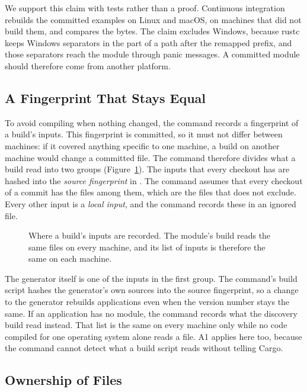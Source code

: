 \documentclass[sigconf,nonacm]{acmart}
\begin{document}
We support this claim with tests rather than a proof. Continuous integration rebuilds the committed examples on Linux and macOS, on machines that did not build them, and compares the bytes. The claim excludes Windows, because rustc keeps Windows separators in the part of a path after the remapped prefix, and those separators reach the module through panic messages. A committed module should therefore come from another platform.

\subsection{A Fingerprint That Stays Equal}

To avoid compiling when nothing changed, the command records a fingerprint of a build's inputs. This fingerprint is committed, so it must not differ between machines: if it covered anything specific to one machine, a build on another machine would change a committed file. The command therefore divides what a build read into two groups (Figure~\ref{fig:inputs}). The inputs that every checkout has are hashed into the \emph{source fingerprint} in . The command assumes that every checkout of a commit has the files among them, which are the files that  does not exclude. Every other input is a \emph{local input}, and the command records these in an ignored file.

\begin{figure}[t]
\centering

\caption{Where a build's inputs are recorded. The module's build reads the same files on every machine, and its list of inputs is therefore the same on each machine.}
\label{fig:inputs}
\end{figure}

The generator itself is one of the inputs in the first group. The command's build script hashes the generator's own sources into the source fingerprint, so a change to the generator rebuilds applications even when the version number stays the same. If an application has no module, the command records what the discovery build read instead. That list is the same on every machine only while no code compiled for one operating system alone reads a file. A1 applies here too, because the command cannot detect what a build script reads without telling Cargo.

\subsection{Ownership of Files}
\end{document}
